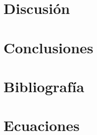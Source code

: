 \documentclass[runningheads]{llncs}
\begin{document}
    \section{Discusión}
    \section{Conclusiones}

    \section*{Bibliografía}
    
    \section{Ecuaciones}
        
\end{document}
